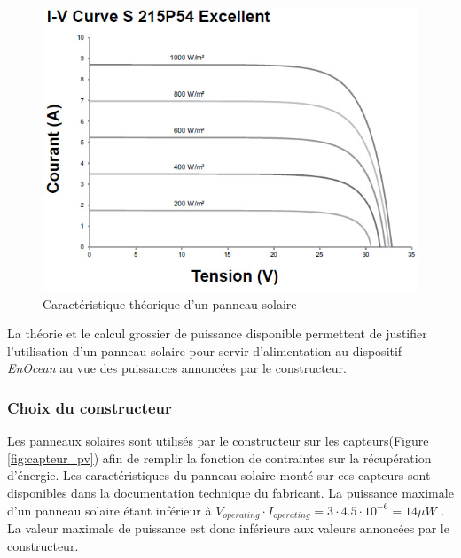 \documentclass{rapportENS}
\begin{document}
\begin{figure}[h!]
    \centering
    \vspace{0.5cm}
    \includegraphics[width=0.7\linewidth]{caracteristique_pv.jpg}
    \caption{Caractéristique théorique d'un panneau solaire}
    \label{fig:caracteristique_pv}
\end{figure}

La théorie et le calcul grossier de puissance disponible permettent de justifier l'utilisation d'un panneau solaire pour servir d'alimentation au dispositif \textit{EnOcean} au vue des puissances annoncées par le constructeur.

 \subsubsection{Choix du constructeur}
 Les panneaux solaires sont utilisés par le constructeur sur les capteurs(Figure \ref{fig:capteur_pv}) afin de remplir la fonction de contraintes sur la récupération d'énergie. Les caractéristiques du panneau solaire monté sur ces capteurs sont disponibles dans la documentation technique du fabricant. La puissance maximale d'un panneau solaire étant inférieur à $V_{operating} \cdot I_{operating} =3\cdot 4.5\cdot 10^{-6} = 14\mu W$ . La valeur maximale de puissance est donc inférieure aux valeurs annoncées par le constructeur.
 
\end{document}
